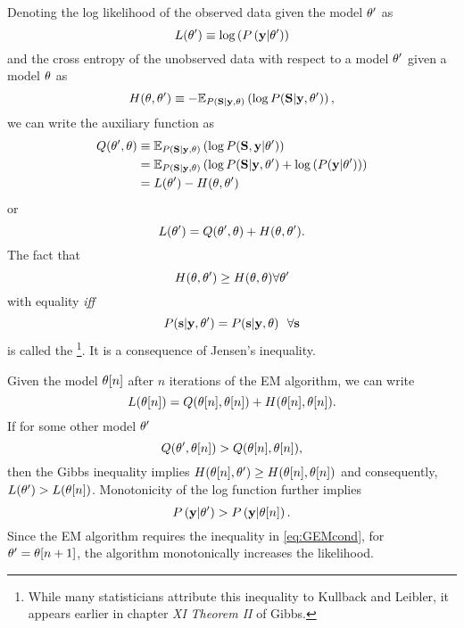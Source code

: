 Denoting the log likelihood of the observed data given the model
$\theta'$ as
\begin{equation*}
  L(\theta') \equiv \log \left( P \left(\mathbf{y}|\theta' \right)\right)
\end{equation*}
and the cross entropy of the unobserved data with respect to a model
$\theta'$ given a model $\theta$ as
\begin{equation*}
  H(\theta, \theta') \equiv - \mathbb{E}_{P
    \left({\bf S}|\mathbf{y},\theta \right)} \left( \log P({\bf S}|\mathbf{y},\theta')
  \right),
\end{equation*}
we can write the auxiliary function as
\begin{align*}
  Q(\theta',\theta) &\equiv \mathbb{E}_{P \left({\bf S}|\mathbf{y} ,\theta\right)}
  \left( \log P({\bf S},\mathbf{y}|\theta') \right)\\
  &= \mathbb{E}_{P \left({\bf S}|\mathbf{y} ,\theta \right)} \left( \log
    P({\bf S}|\mathbf{y},\theta') + \log \left( P(\mathbf{y}|\theta') \right)
  \right)\\
  &= L(\theta') - H(\theta, \theta')
\end{align*}
or
\begin{equation}
  \label{eq:LQH}
   L(\theta') = Q(\theta',\theta) + H(\theta,
   \theta').
\end{equation}
The fact that
\begin{equation}
  \label{eq:GibbsIE}
  H(\theta, \theta') \geq  H(\theta, \theta)
  \forall \theta'
\end{equation}
with equality \emph{iff}
\begin{equation*}
  P({\bf s}|\mathbf{y},\theta') =  P({\bf s}|\mathbf{y},\theta) ~~ \forall {\bf s}
\end{equation*}
is called the \emph{}\footnote{While many
  statisticians attribute this inequality to Kullback and
  Leibler\cite{Kullback51}, it appears earlier in chapter {\em XI}
  {\em Theorem II} of Gibbs\cite{Gibbs}.}.  It is a consequence of
 Jensen's inequality.

Given the model ${\theta}{[n]}$ after $n$ iterations of the EM
algorithm, we can write
\begin{equation}
  L({\theta}{[n]}) = Q({\theta}{[n]}, {\theta}{[n]}) +
  H({\theta}{[n]}, {\theta}{[n]}).
\end{equation}
If for some other model $\theta'$
\begin{equation}
  \label{eq:GEMcond}
  Q(\theta',{\theta}{[n]}) >
  Q({\theta}{[n]},{\theta}{[n]}),
\end{equation}
then the Gibbs inequality implies $H({\theta}{[n]}, \theta') \geq H({\theta}{[n]},
{\theta}{[n]})$ and consequently, $L(\theta') >
L({\theta}{[n]})$.  Monotonicity of the log function further
implies
\begin{equation*}
  P \left(\mathbf{y} |\theta'\right) > P \left(\mathbf{y}|{\theta}{[n]} \right) .
\end{equation*}
Since the EM algorithm requires the inequality in \eqref{eq:GEMcond},
for $\theta' = {\theta}{[n+1]}$, the algorithm
monotonically increases the likelihood.

